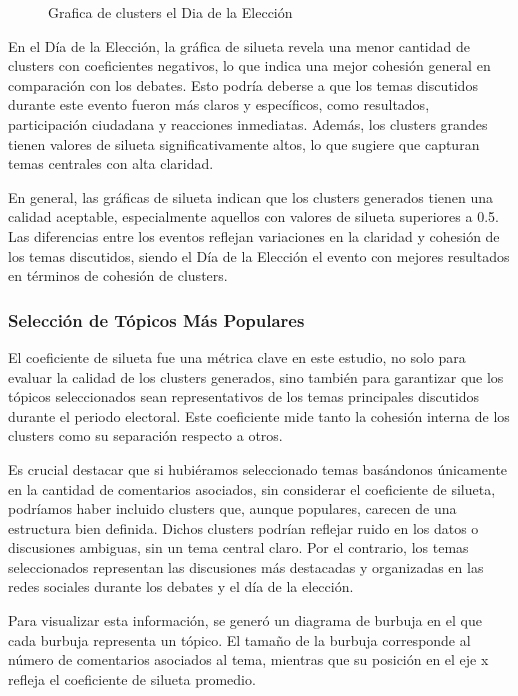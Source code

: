\documentclass[10pt, a4paper]{article}
\begin{document}
\begin{figure}[h!]
\begin{minipage}{0.49\textwidth}
			\caption{Grafica de clusters el Dia de la Elección}
			\label{fig:clustDiaEleccion}
		\end{minipage}
	\end{figure}
	
	En el Día de la Elección, la gráfica de silueta revela una menor cantidad de clusters con coeficientes negativos, lo que indica una mejor cohesión general en comparación con los debates. Esto podría deberse a que los temas discutidos durante este evento fueron más claros y específicos, como resultados, participación ciudadana y reacciones inmediatas. Además, los clusters grandes tienen valores de silueta significativamente altos, lo que sugiere que capturan temas centrales con alta claridad.
	
	En general, las gráficas de silueta indican que los clusters generados tienen una calidad aceptable, especialmente aquellos con valores de silueta superiores a 0.5. Las diferencias entre los eventos reflejan variaciones en la claridad y cohesión de los temas discutidos, siendo el Día de la Elección el evento con mejores resultados en términos de cohesión de clusters.
	
	\subsubsection{Selección de Tópicos Más Populares}
	
	El coeficiente de silueta fue una métrica clave en este estudio, no solo para evaluar la calidad de los clusters generados, sino también para garantizar que los tópicos seleccionados sean representativos de los temas principales discutidos durante el periodo electoral. Este coeficiente mide tanto la cohesión interna de los clusters como su separación respecto a otros. 
	
	Es crucial destacar que si hubiéramos seleccionado temas basándonos únicamente en la cantidad de comentarios asociados, sin considerar el coeficiente de silueta, podríamos haber incluido clusters que, aunque populares, carecen de una estructura bien definida. Dichos clusters podrían reflejar ruido en los datos o discusiones ambiguas, sin un tema central claro. Por el contrario, los temas seleccionados representan las discusiones más destacadas y organizadas en las redes sociales durante los debates y el día de la elección.
	
	Para visualizar esta información, se generó un diagrama de burbuja en el que cada burbuja representa un tópico. El tamaño de la burbuja corresponde al número de comentarios asociados al tema, mientras que su posición en el eje x refleja el coeficiente de silueta promedio.
	
\end{document}
